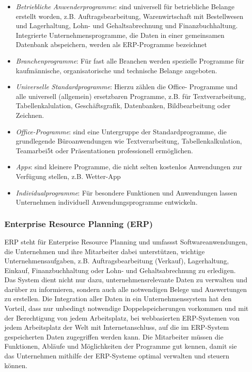 \documentclass[a4paper, 12pt]{report}
\begin{document}
\begin{itemize}
    \item \emph{Betriebliche Anwenderprogramme}: sind universell für
	betriebliche Belange erstellt worden, z.B. Auftragsbearbeitung,
	Warenwirtschaft mit Bestellwesen und Lagerhaltung, Lohn- und
	Gehaltsabrechnung und Finanzbuchhaltung. Integrierte
	Unternehmensprogramme, die Daten in einer gemeinsamen Datenbank
	abspeichern, werden als ERP-Programme bezeichnet
    \item \emph{Branchenprogramme}: Für fast alle Branchen werden spezielle
	Programme für kaufmännische, organisatorische und technische Belange
	angeboten.
    \item \emph{Universelle Standardprogramme}: Hierzu zählen die Office-
	Programme und alle universell (allgemein) ersetzbaren Programme, z.B.
	für Textverarbeitung, Tabellenkalulation, Geschäftsgrafik, Datenbanken,
	Bildbearbeitung oder Zeichnen.
    \item \emph{Office-Programme}: sind eine Untergruppe der Standardprogramme,
	die grundlegende Büroanwendungen wie Textverarbeitung,
	Tabellenkalkulation, Teamarbei5t oder Präsentationen professionell
	ermöglichen.
    \item \emph{Apps}: sind kleinere Programme, die nicht selten kostenlos
	Anwendungen zur Verfügung stellen, z.B. Wetter-App
    \item \emph{Individualprogramme}: Für besondere Funktionen und Anwendungen
	lassen Unternehmen individuell Anwendungsprogramme entwickeln.
\end{itemize}

\subsubsection{Enterprise Resource Planning (ERP)}

ERP steht für Enterprise Resource Planning und umfassst Softwareanwendungen, die
Unternehmen und ihre Mitarbeiter dabei unterstützen, wichtige
Unternehmensaufgaben, z.B. Auftragsbearbeitung (Verkauf), Lagerhaltung, Einkauf,
Finanzbuchhaltung oder Lohn- und Gehaltsabrechnung zu erledigen. Das System
dient nicht nur dazu, unternehmensrelevante Daten zu verwalten und darüber zu
informieren, sondern auch alle notwendigen Belege und Auswertungen zu erstellen.
Die Integration aller Daten in ein Unternehmenssystem hat den Vorteil, dass nur
unbedingt notwendige Doppelspeicherungen vorkommen und mit der Berechtigung von
jedem Arbeitsplatz, bei webbasierten ERP-Systemen von jedem Arbeitsplatz der
Welt mit Internetanschluss, auf die im ERP-System gespeicherten Daten
zugegriffen werden kann. Die Mitarbeiter müssen die Funktionen, Abläufe und
Möglichkeiten der Programme gut kennen, damit sie das Unternehmen mithilfe der
ERP-Systeme optimal verwalten und steuern können. \\
\end{document}
